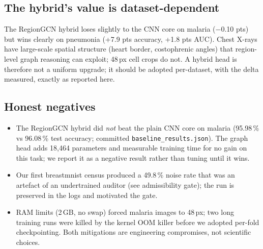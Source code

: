 \subsection{The hybrid's value is dataset-dependent}
The RegionGCN hybrid loses slightly to the CNN core on malaria
($-$0.10 pts) but wins clearly on pneumonia (+7.9 pts accuracy,
+1.8 pts AUC). Chest X-rays have large-scale spatial structure (heart
border, costophrenic angles) that region-level graph reasoning can
exploit; 48\,px cell crops do not. A hybrid head is therefore not a
uniform upgrade; it should be adopted per-dataset, with the delta
measured, exactly as reported here.
\subsection{Honest negatives}
\begin{itemize}
\item The RegionGCN hybrid did \emph{not} beat the plain CNN core on
malaria (95.98\,\% vs 96.08\,\% test accuracy; committed
\texttt{baseline\_results.json}). The graph head adds 18{,}464 parameters
and measurable training time for no gain on this task; we report it as a
negative result rather than tuning until it wins.
\item Our first breastmnist census produced a 49.8\,\% noise rate that was
an artefact of an undertrained auditor (see admissibility gate); the run
is preserved in the logs and motivated the gate.
\item RAM limits (2\,GB, no swap) forced malaria images to 48\,px; two
long training runs were killed by the kernel OOM killer before we adopted
per-fold checkpointing. Both mitigations are engineering compromises, not
scientific choices.
\end{itemize}

